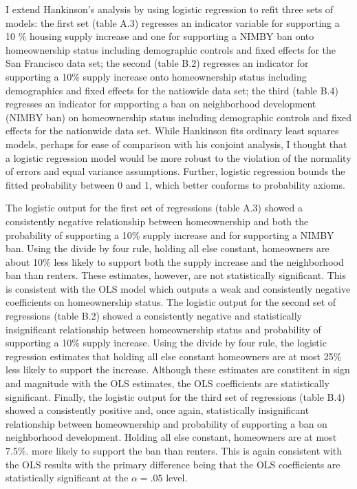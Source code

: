 \documentclass[]{article}
\begin{document}
I extend Hankinson's analysis by using logistic regression to refit three sets of models: the first set (table A.3) regresses an indicator variable for supporting a 10 \% housing supply increase and one for supporting a NIMBY ban onto homeownership status including demographic controls and fixed effects for the San Francisco data set; the second (table B.2) regresses an indicator for supporting a 10\% supply increase onto homeownership status including demographics and fixed effects for the natiowide data set; the third (table B.4) regresses an indicator for supporting a ban on neighborhood development (NIMBY ban) on homeownership status including demographic controls and fixed effects for the nationwide data set. While Hankinson fits ordinary least squares models, perhaps for ease of comparison with his conjoint analysis, I thought that a logistic regression model would be more robust to the violation of the normality of errors and equal variance assumptions. Further, logistic regression bounds the fitted probability between 0 and 1, which better conforms to probability axioms.

The logistic output for the first set of regressions (table A.3) showed a consistently negative relationship between homeownership and both the probability of supporting a 10\% supply increase and for supporting a NIMBY ban. Using the divide by four rule, holding all else constant, homeowners are about 10\% less likely to support both the supply increase and the neighborhood ban than renters. These estimates, however, are not statistically significant. This is consistent with the OLS model which outputs a weak and consistently negative coefficients on homeownership status. The logistic output for the second set of regressions (table B.2) showed a consistently negative and statistically insignificant relationship between homeownership status and probability of supporting a 10\% supply increase. Using the divide by four rule, the logistic regression estimates that holding all else constant homeowners are at most 25\% less likely to support the increase. Although these estimates are constitent in sign and magnitude with the OLS estimates, the OLS coefficients are statistically significant. Finally, the logistic output for the third set of regressions (table B.4) showed a consistently positive and, once again, statistically insignificant relationship between homeownership and probability of supporting a ban on neighborhood development. Holding all else constant, homeowners are at most 7.5\%. more likely to support the ban than renters. This is again consistent with the OLS results with the primary difference being that the OLS coefficients are statistically significant at the \(\alpha = .05\) level.
\end{document}

